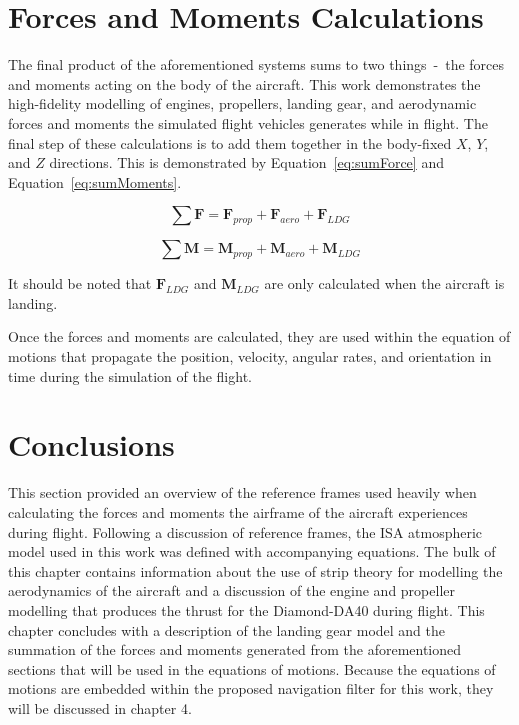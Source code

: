 \section{Forces and Moments Calculations}
The final product of the aforementioned systems sums to two things~-~the forces and moments acting on the body of the aircraft. This work demonstrates the high-fidelity modelling of engines, propellers, landing gear, and aerodynamic forces and moments the simulated flight vehicles generates while in flight. The final step of these calculations is to add them together in the body-fixed \(X\), \(Y\), and \(Z\) directions. This is demonstrated by Equation~\ref{eq:sumForce} and Equation~\ref{eq:sumMoments}.

\begin{equation}
    \sum \mathbf{F} = \mathbf{F}_{prop} + \mathbf{F}_{aero} + \mathbf{F}_{LDG}
    \label{eq:sumForce}
\end{equation}

\begin{equation}
    \sum \mathbf{M} = \mathbf{M}_{prop} + \mathbf{M}_{aero} + \mathbf{M}_{LDG}
    \label{eq:sumMoments}
\end{equation}

It should be noted that \(\mathbf{F}_{LDG}\) and \(\mathbf{M}_{LDG}\) are only calculated when the aircraft is landing.

Once the forces and moments are calculated, they are used within the equation of motions that propagate the position, velocity, angular rates, and orientation in time during the simulation of the flight.

\section{Conclusions}

This section provided an overview of the reference frames used heavily when calculating the forces and moments the airframe of the aircraft experiences during flight. Following a discussion of reference frames, the ISA atmospheric model used in this work was defined with accompanying equations. The bulk of this chapter contains information about the use of strip theory for modelling the aerodynamics of the aircraft and a discussion of the engine and propeller modelling that produces the thrust for the Diamond-DA40 during flight. This chapter concludes with a description of the landing gear model and the summation of the forces and moments generated from the aforementioned sections that will be used in the equations of motions. Because the equations of motions are embedded within the proposed navigation filter for this work, they will be discussed in chapter 4.
\clearpage
